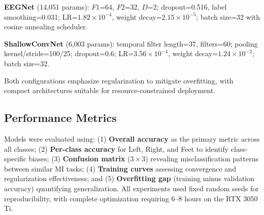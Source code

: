 \textbf{EEGNet} (14,051 params): $F1$=64, $F2$=32, $D$=2; dropout=0.516, label smoothing=0.031; LR=$1.82\times10^{-4}$, weight decay=$2.15\times10^{-5}$; batch size=32 with cosine annealing scheduler.

\textbf{ShallowConvNet} (6,003 params): temporal filter length=37, filters=60; pooling kernel/stride=100/25; dropout=0.6; LR=$3.56\times10^{-4}$, weight decay=$1.24\times10^{-2}$; batch size=32.

Both configurations emphasize regularization to mitigate overfitting, with compact architectures suitable for resource-constrained deployment.

\subsection{Performance Metrics}
Models were evaluated using: (1) \textbf{Overall accuracy} as the primary metric across all classes; (2) \textbf{Per-class accuracy} for Left, Right, and Feet to identify class-specific biases; (3) \textbf{Confusion matrix} ($3\times3$) revealing misclassification patterns between similar MI tasks; (4) \textbf{Training curves} assessing convergence and regularization effectiveness; and (5) \textbf{Overfitting gap} (training minus validation accuracy) quantifying generalization. All experiments used fixed random seeds for reproducibility, with complete optimization requiring 6--8 hours on the RTX 3050 Ti.
